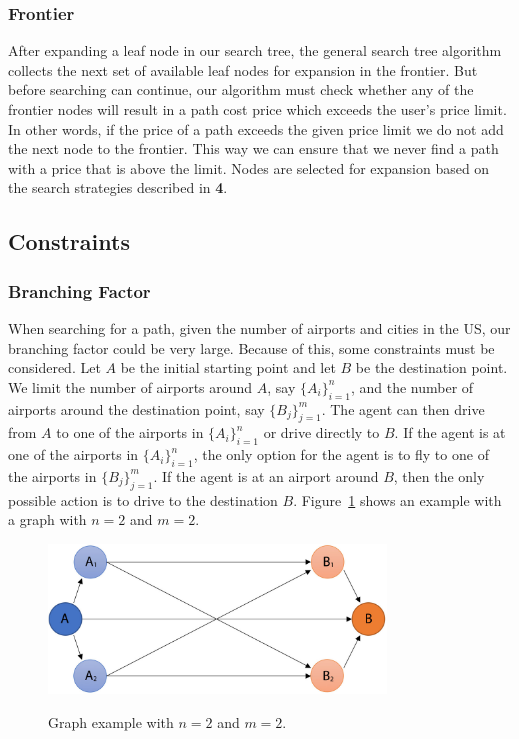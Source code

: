 \documentclass[11pt]{article}
\begin{document}
\subsubsection{Frontier}

After expanding a leaf node in our search tree, the general search tree algorithm collects the next set of available leaf nodes for expansion in the frontier. But before searching can continue, our algorithm must check whether any of the frontier nodes will result in a path cost price which exceeds the user's price limit. In other words, if the price of a path exceeds the given price limit we do not add the next node to the frontier. This way we can ensure that we never find a path with a price that is above the limit. Nodes are selected for expansion based on the search strategies described in {\bf 4}.

\subsection{Constraints}

\subsubsection{Branching Factor}

When searching for a path, given the number of airports and cities in the US, our branching factor could be very large. Because of this, some constraints must be considered. Let $A$ be the initial starting point and let $B$ be the destination point. We limit the number of airports around $A$, say $\{ A_i \}_{i=1}^n$, and the number of airports around the destination point, say $\{ B_j \}_{j=1}^m$. The agent can then drive from $A$ to one of the airports in $\{ A_i \}_{i=1}^n$ or drive directly to $B$. If the agent is at one of the airports in $\{ A_i \}_{i=1}^n$, the only option for the agent is to fly to one of the airports in $\{ B_j \}_{j=1}^m$. If the agent is at an airport around $B$, then the only possible action is to drive to the destination $B$. Figure~\ref{fig:graph_example} shows an example with a graph with $n = 2$ and $m = 2$.
\begin{figure}[!ht]
  \caption{Graph example with $n=2$ and $m=2$.}
  \centering
  \includegraphics[width=0.8\textwidth]{Graph_example_n2}
  \label{fig:graph_example}
\end{figure}
\end{document}
